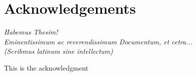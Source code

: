\newpage
\section*{Acknowledgements}
\begin{singlespace}
	\emph{Habemus Thesim!\\
		Eminentissimum ac reverendissimum Documentum, et cetra...\\
		(Scribmus latinum sine intellectum)}
\end{singlespace}

This is the acknowledgment

